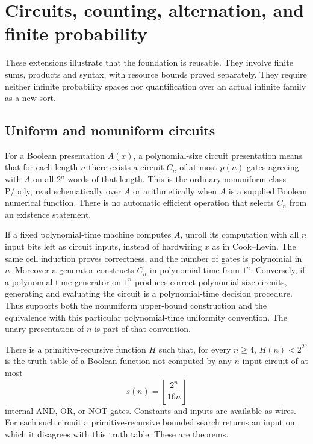\section{Circuits, counting, alternation, and finite probability}
\label{sec:extensions}

These extensions illustrate that the foundation is reusable. They involve
finite sums, products and syntax, with resource bounds proved separately.
They require neither infinite probability spaces nor quantification over an
actual infinite family as a new sort.

\subsection{Uniform and nonuniform circuits}

For a Boolean presentation \(A(x)\), a polynomial-size circuit presentation
means that for each length \(n\) there exists a circuit \(C_n\) of at most
\(p(n)\) gates agreeing with \(A\) on all \(2^n\) words of that length.
This is the ordinary nonuniform class P/poly, read schematically over \(A\)
or arithmetically when \(A\) is a supplied Boolean numerical function.
There is no automatic efficient operation that selects \(C_n\) from an
existence statement.

If a fixed polynomial-time machine computes \(A\), unroll its computation
with all \(n\) input bits left as circuit inputs, instead of hardwiring
\(x\) as in Cook--Levin. The same cell induction proves correctness, and
the number of gates is polynomial in \(n\). Moreover a generator constructs
\(C_n\) in polynomial time from \(1^n\). Conversely, if a polynomial-time
generator on \(1^n\) produces correct polynomial-size circuits, generating
and evaluating the circuit is a polynomial-time decision procedure. Thus
\ipra{} supports both the nonuniform upper-bound construction and the
equivalence with this particular polynomial-time uniformity convention.
The unary presentation of \(n\) is part of that convention.

\begin{theorem}
\label{thm:circuitcount}
There is a primitive-recursive function \(H\) such that, for every \(n\ge4\),
\(H(n)<2^{2^n}\) is the truth table of a Boolean function not computed by
any \(n\)-input circuit of at most
\[
 s(n)=\left\lfloor\frac{2^n}{16n}\right\rfloor
\]
internal AND, OR, or NOT gates. Constants and inputs are available as wires.
For each such circuit a primitive-recursive bounded search returns an input
on which it disagrees with this truth table. These are \ipra{} theorems.
\end{theorem}

